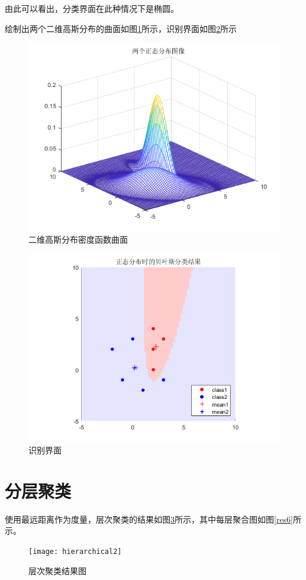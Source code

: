 \documentclass[cn]{elegantbook}
\begin{document}
由此可以看出，分类界面在此种情况下是椭圆。

绘制出两个二维高斯分布的曲面如图\ref{gauss1}所示，识别界面如图\ref{res1}所示
\begin{figure}[!h]
	\centering
	\includegraphics[width=\linewidth]{gauss1}
	\caption{\label{gauss1}二维高斯分布密度函数曲面}
\end{figure}
\begin{figure}[!h]
	\centering
	\includegraphics[width=\linewidth]{images/res1}
	\caption{\label{res1}识别界面}
\end{figure}

\newpage
\section{分层聚类}
使用最远距离作为度量，层次聚类的结果如图\ref{res5}所示，其中每层聚合图如图\ref{res6}所示。
\begin{figure}[!h]
	\centering
	\texttt{[image: hierarchical2]}
	\caption{\label{res5}层次聚类结果图}
\end{figure}
\end{document}
